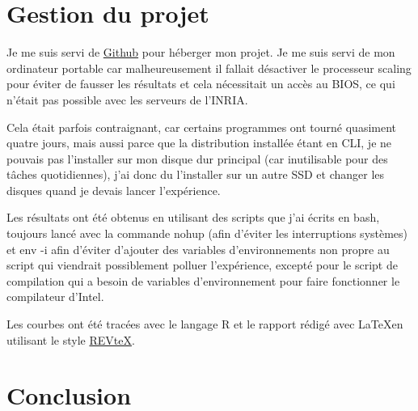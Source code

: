 \documentclass[
 aip,
 jmp,
 amsmath,amssymb,
 reprint
]{revtex4-1}
\begin{document}
\section{Gestion du projet}
Je me suis servi de \href{https://github.com/ingambe/ter/}{Github} pour héberger mon projet. Je me suis servi de mon ordinateur portable car malheureusement il fallait désactiver le processeur scaling pour éviter de fausser les résultats et cela nécessitait un accès au BIOS, ce qui n'était pas possible avec les serveurs de l'INRIA.\par
Cela était parfois contraignant, car certains programmes ont tourné quasiment quatre jours, mais aussi parce que la distribution installée étant en CLI, je ne pouvais pas l'installer sur mon disque dur principal (car inutilisable pour des tâches quotidiennes), j'ai donc du l'installer sur un autre SSD et changer les disques quand je devais lancer l'expérience.\par
Les résultats ont été obtenus en utilisant des scripts que j'ai écrits en bash, toujours lancé avec la commande nohup (afin d'éviter les interruptions systèmes) et  env -i afin d'éviter d'ajouter des variables d'environnements non propre au script qui viendrait possiblement polluer l'expérience, excepté pour le script de compilation qui a besoin de variables d'environnement pour faire fonctionner le compilateur d'Intel.\par
Les courbes ont été tracées avec le langage R et le rapport rédigé avec \LaTeX en utilisant le style \href{https://journals.aps.org/revtex}{REVteX}.

\section{Conclusion}
\end{document}
